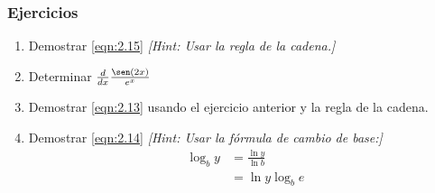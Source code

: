 \subsubsection{Ejercicios}

\begin{enumerate}
	\item Demostrar \cref{eqn:2.15} \textsl{[Hint: Usar la regla de la cadena.]}
        \item Determinar $\frac{d}{dx}\frac{\sen(2x)}{e^x}$
	\item Demostrar \cref{eqn:2.13} usando el ejercicio anterior y la regla de la cadena.
	\item Demostrar \cref{eqn:2.14} \textsl{[Hint: Usar la fórmula de cambio de base:]
		\begin{align*}
		\log_b y&=\frac{\ln y}{\ln b}\\
		&=\ln y\log_b e
		\end{align*}}
\end{enumerate}